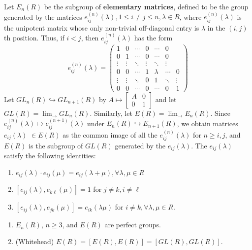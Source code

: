 Let $E_n(R)$ be the subgroup of \textbf{elementary matrices}, defined to be the group generated by the matrices $e_{i j}^{(n)}(\lambda), 1 \leq i \neq j \leq n, \lambda \in R$, where $e_{i j}^{(n)}(\lambda)$ is the unipotent matrix whose only non-trivial off-diagonal entry is $\lambda$ in the $(i, j)$ th position. Thus, if $i<j$, then $e_{i j}^{(n)}(\lambda)$ has the form 
\[
e_{ij}^{(n)}(\lambda) =
\begin{pmatrix}
1 & 0 & \cdots & 0 & \cdots & 0 \\
0 & 1 & \cdots & 0 & \cdots & 0 \\
\vdots & \vdots & \ddots & \vdots & \ddots & \vdots \\
0 & 0 & \cdots & 1 & \lambda & \cdots & 0 \\
\vdots & \vdots & \ddots & 0 & 1 & \ddots & \vdots \\
0 & 0 & \cdots & 0 & \cdots & 0 & 1
\end{pmatrix}
\]
Let $G L_n(R) \hookrightarrow G L_{n+1}(R)$ by
$
A \longmapsto\left[\begin{array}{ll}
A & 0 \\
0 & 1
\end{array}\right]
$
and let $G L(R)=\lim _{\rightarrow} G L_n(R)$. Similarly, let $E(R)=\lim _{\rightarrow} E_n(R)$. Since $e_{i j}^{(n)}(\lambda) \longmapsto e_{i j}^{(n+1)}(\lambda)$ under $E_n(R) \hookrightarrow E_{n+1}(R)$, we obtain matrices $e_{i j}(\lambda)$ $\in E(R)$ as the common image of all the $e_{i j}^{(n)}(\lambda)$ for $n \geq i, j$, and $E(R)$ is the subgroup of $G L(R)$ generated by the $e_{i j}(\lambda)$. The $e_{i j}(\lambda)$ satisfy the following identities:
\begin{enumerate}
    \item $e_{i j}(\lambda) \cdot e_{i j}(\mu)=e_{i j}(\lambda+\mu), \forall \lambda, \mu \in R$
    \item $\left[e_{i j}(\lambda), e_{k \ell}(\mu)\right]=1$ for $j \neq k, i \neq \ell$
    \item $\left[e_{i j}(\lambda), e_{j k}(\mu)\right]=e_{i k}(\lambda \mu)$ for $i \neq k, \forall \lambda, \mu \in R$.
\end{enumerate}

\begin{lemm}
    \begin{enumerate}
        \item $E_n(R)$, $n \geq 3$, and $E(R)$ are perfect groups.
        \item (Whitehead) $E(R)=[E(R), E(R)]=[G L(R), G L(R)]$.
    \end{enumerate}
\end{lemm}


